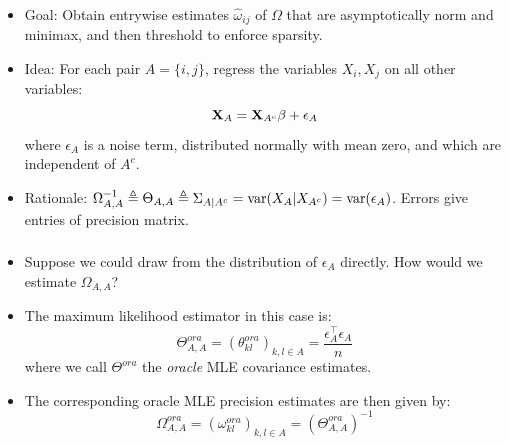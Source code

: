\begin{frame}[fragile] \frametitle{}
    \begin{itemize}
        \item Goal: Obtain entrywise estimates $\hat\omega_{ij}$ of $\Omega$
            that are asymptotically norm and minimax, and then threshold to
            enforce sparsity.
        \item Idea: For each pair $A = \{i, j\}$, regress the variables $X_i,
            X_j$ on all other variables:
            $$
            \mathbf{X}_A = \mathbf{X}_{A^c}\beta + \epsilon_A
            $$
            where $\epsilon_A$ is a noise term, distributed normally with mean
            zero, and which are independent of $A^c$.
        \item Rationale: $\Omega_{A, A}^{-1} \triangleq \Theta_{A, A} \triangleq
            \Sigma_{A|A^c} = \operatorname{\mathrm{var}}(X_A|X_{A^c}) = \operatorname{\mathrm{var}}(\epsilon_A)$.  Errors
            give entries of precision matrix.
    \end{itemize}
\end{frame}
\begin{frame}[fragile] \frametitle{}

    \begin{itemize}
        \item Suppose we could draw from the distribution of $\epsilon_A$
            directly.  How would we estimate $\Omega_{A, A}$?  
        \item The maximum likelihood estimator in this case is:
            $$
            \Theta^{ora}_{A, A} = (\theta^{ora}_{kl})_{k, l \in A}
            = \frac{\epsilon_A^\top\epsilon_A}{n}
            $$
            where we call $\Theta^{ora}$ the \textit{oracle} MLE covariance estimates.
        \item The corresponding oracle MLE precision estimates are then given
            by:
            $$
            \Omega^{ora}_{A, A} = (\omega^{ora}_{kl})_{k, l \in A}
                = \left(\Theta^{ora}_{A, A}\right)^{-1}
            $$
    \end{itemize}
\end{frame}
